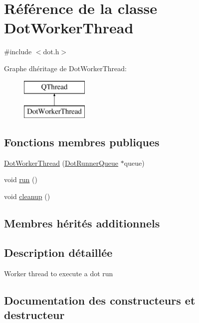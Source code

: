 \hypertarget{class_dot_worker_thread}{}\section{Référence de la classe Dot\+Worker\+Thread}
\label{class_dot_worker_thread}


{\ttfamily \#include $<$dot.\+h$>$}

Graphe d\textquotesingle{}héritage de Dot\+Worker\+Thread\+:\begin{figure}[H]
\begin{center}
\leavevmode
\includegraphics[height=2.000000cm]{class_dot_worker_thread}
\end{center}
\end{figure}
\subsection*{Fonctions membres publiques}
\begin{DoxyCompactItemize}
\item 
\hyperlink{class_dot_worker_thread_ab60de9dd74465af1b2af295846db2db5}{Dot\+Worker\+Thread} (\hyperlink{class_dot_runner_queue}{Dot\+Runner\+Queue} $\ast$queue)
\item 
void \hyperlink{class_dot_worker_thread_a573402f10e5d1b1fba1954a105a1c227}{run} ()
\item 
void \hyperlink{class_dot_worker_thread_abdef6c24880c1628f13a2a82e6374c0e}{cleanup} ()
\end{DoxyCompactItemize}
\subsection*{Membres hérités additionnels}


\subsection{Description détaillée}
Worker thread to execute a dot run 

\subsection{Documentation des constructeurs et destructeur}
\hypertarget{class_dot_worker_thread_ab60de9dd74465af1b2af295846db2db5}{}
